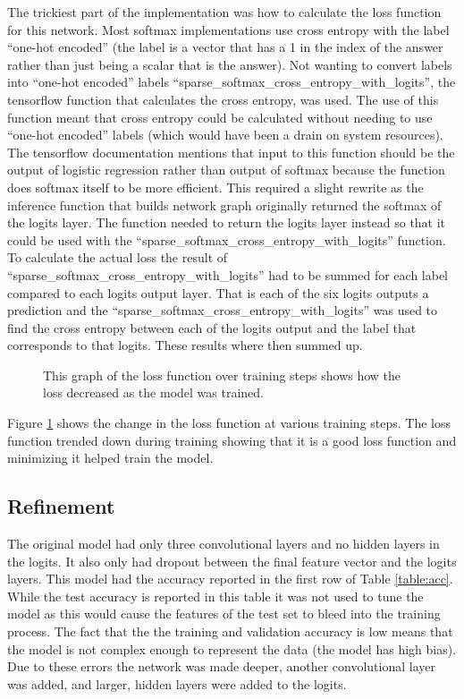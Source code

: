 \documentclass[12pt,twocolumn,letterpaper]{article}
\begin{document}
The trickiest part of the implementation was how to calculate the loss function 
for this network. Most softmax implementations use cross entropy with the 
label ``one-hot encoded'' (the label is a vector that has a 1 in the index of the 
answer rather than just being a scalar that is the answer). Not wanting to 
convert labels into ``one-hot encoded'' labels ``sparse\_softmax\_cross\_entropy\_with\_logits'', 
the tensorflow function that calculates the cross entropy, was used. The use of 
this function meant that cross entropy could be calculated  
without needing to use ``one-hot encoded'' labels (which would have been a drain 
on system resources). The tensorflow documentation 
mentions that input to this function should be the output of logistic regression 
rather than output of softmax because the function does softmax itself to be more 
efficient. This required a slight rewrite as the inference function that builds 
network graph originally returned the softmax of the logits layer. The function 
needed to return the logits layer instead so that it could be used with the 
``sparse\_softmax\_cross\_entropy\_with\_logits'' function. To calculate the 
actual loss the result of ``sparse\_softmax\_cross\_entropy\_with\_logits'' had 
to be summed for each label compared to each logits output layer. That is each 
of the six logits outputs a prediction and the 
``sparse\_softmax\_cross\_entropy\_with\_logits'' was used to find the cross 
entropy between each of the logits output and the label that corresponds to that 
logits. These results where then summed up. 

\begin{figure}[t]
\begin{center}
\end{center}
   \caption{This graph of the loss function over training steps shows how the loss
   decreased as the model was trained.}
\label{fig:loss}
\end{figure} 

Figure \ref{fig:loss} shows 
the change in the loss function at various training steps. The loss function 
trended down during training showing that it is a good loss function and minimizing 
it helped train the model. 
\subsection{Refinement}
The original model had only three convolutional layers and no hidden layers in 
the logits. It also only had dropout between the final feature vector and the 
logits layers. This model had the accuracy reported in the first row of 
Table \ref{table:acc}. While the test accuracy is reported in this table it was not used to 
tune the model as this would cause the features of the test set to bleed into 
the training process. The fact that the the training and validation accuracy is 
low means that the model is not complex enough to represent the data (the model 
has high bias). Due to these errors the network was made deeper, another 
convolutional layer was added, and larger, hidden layers were added to the 
logits. 
\end{document}
